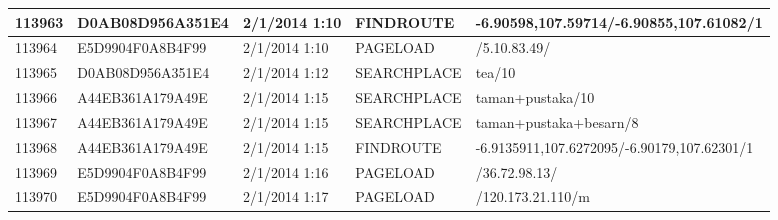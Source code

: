 \begin{longtable}{|p{1cm}|l|l|l|p{8cm}|}
113963         & D0AB08D956A351E4 & 2/1/2014 1:10            & FINDROUTE       & -6.90598,107.59714/-6.90855,107.61082/1                                                                                                                                                                               \\ \hline
113964         & E5D9904F0A8B4F99 & 2/1/2014 1:10            & PAGELOAD        & /5.10.83.49/                                                                                                                                                                                                          \\ \hline
113965         & D0AB08D956A351E4 & 2/1/2014 1:12            & SEARCHPLACE     & tea/10                                                                                                                                                                                                                \\ \hline
113966         & A44EB361A179A49E & 2/1/2014 1:15            & SEARCHPLACE     & taman+pustaka/10                                                                                                                                                                                                      \\ \hline
113967         & A44EB361A179A49E & 2/1/2014 1:15            & SEARCHPLACE     & taman+pustaka+besarn/8                                                                                                                                                                                                \\ \hline
113968         & A44EB361A179A49E & 2/1/2014 1:15            & FINDROUTE       & -6.9135911,107.6272095/-6.90179,107.62301/1                                                                                                                                                                           \\ \hline
113969         & E5D9904F0A8B4F99 & 2/1/2014 1:16            & PAGELOAD        & /36.72.98.13/                                                                                                                                                                                                         \\ \hline
113970         & E5D9904F0A8B4F99 & 2/1/2014 1:17            & PAGELOAD        & /120.173.21.110/m                                                                                                                                                                                                     \\ \hline

\end{longtable}
